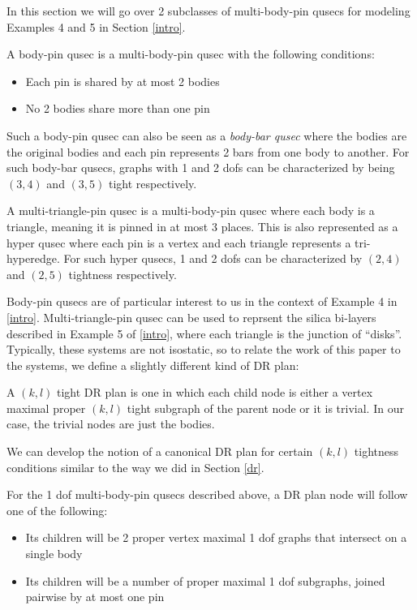 In this section we will go over 2 subclasses of multi-body-pin qusecs for modeling Examples 4 and 5 in Section \ref{intro}.

\begin{definition}
    A body-pin qusec is a multi-body-pin qusec with the following conditions:
    \begin{itemize}
        \item Each pin is shared by at most 2 bodies
        \item No 2 bodies share more than one pin
    \end{itemize}
    Such a body-pin qusec can also be seen as a {\em body-bar qusec} where the bodies are the original bodies and each pin represents 2 bars from one body to another. For such body-bar qusecs, graphs with 1 and 2 dofs can be characterized by being $(3,4)$ and $(3,5)$ tight respectively.
\end{definition}

\begin{definition}
    A multi-triangle-pin qusec is a multi-body-pin qusec where each body is a triangle, meaning it is pinned in at most 3 places. This is also represented as a hyper qusec where each pin is a vertex and each triangle represents a tri-hyperedge. For such hyper qusecs, 1 and 2 dofs can be characterized by $(2,4)$ and $(2,5)$ tightness respectively.
\end{definition}

Body-pin qusecs are of particular interest to us in the context of Example 4 in \ref{intro}. Multi-triangle-pin qusec can be used to reprsent the silica bi-layers described in Example 5 of \ref{intro}, where each triangle is the junction of ``disks''. Typically, these systems are not isostatic, so to relate the work of this paper to the systems, we define a slightly different kind of DR plan:

\begin{definition}
    A $(k,l)$ tight DR plan is one in which each child node is either a vertex maximal proper $(k,l)$ tight subgraph of the parent node or it is trivial. In our case, the trivial nodes are just the bodies.
\end{definition}

We can develop the notion of a canonical DR plan for certain $(k,l)$ tightness conditions similar to the way we did in Section \ref{dr}.

\begin{remark}
\label{rem:1dofcanon}
    For the 1 dof multi-body-pin qusecs described above, a DR plan node will follow one of the following:

    \begin{itemize}
        \item Its children will be 2 proper vertex maximal 1 dof graphs that intersect on a single body
        \item Its children will be a number of proper maximal 1 dof subgraphs, joined pairwise by at most one pin
    \end{itemize}
\end{remark}

